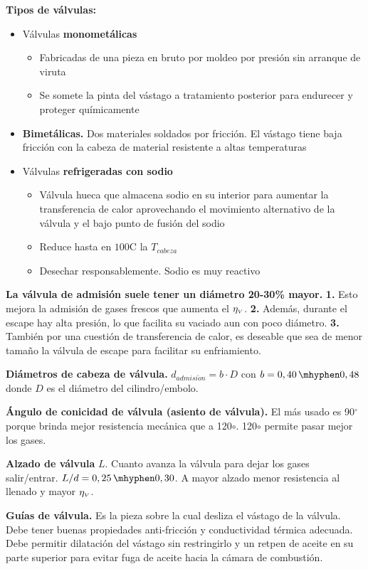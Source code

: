 \textbf{Tipos de válvulas:}
\begin{itemize}
    \item Válvulas \textbf{monometálicas}
    \begin{itemize}
        \item Fabricadas de una pieza en bruto por moldeo por presión sin arranque de viruta
        \item Se somete la pinta del vástago a tratamiento posterior para endurecer y proteger químicamente
    \end{itemize}
    \item \textbf{Bimetálicas.} Dos materiales soldados por fricción. El vástago tiene baja fricción con la cabeza de material resistente a altas temperaturas
    \item Válvulas \textbf{refrigeradas con sodio}
    \begin{itemize}
        \item Válvula hueca que almacena sodio en su interior para aumentar la transferencia de calor aprovechando el movimiento alternativo de la válvula y el bajo punto de fusión del sodio
        \item Reduce hasta en $100$\grad C la $T_{cabeza}$
        \item Desechar responsablemente. Sodio es muy reactivo
\end{itemize}
\end{itemize}
    \textbf{La válvula de admisión suele tener un diámetro 20-30\% mayor.} \textbf{1.} Esto mejora la admisión de gases frescos que aumenta el $\eta_{{\mbox{\tiny$V$}}}$. \textbf{2.} Además, durante el escape hay alta presión, lo que facilita su vaciado aun con poco diámetro. \textbf{3.} También por una cuestión de transferencia de calor, es deseable que sea de menor tamaño la válvula de escape para facilitar su enfriamiento.
    
    \textbf{Diámetros de cabeza de válvula.} $d_{admisi\acute{o}n}=b\cdot D$ con $b=0,40\hyph0,48$ donde $D$ es el diámetro del cilindro/embolo.
    
    \textbf{Ángulo de conicidad de válvula (asiento de válvula).} El más usado es 90$^\circ$ porque brinda mejor resistencia mecánica que a 120$\circ$. 120$\circ$ permite pasar mejor los gases.
    
    \textbf{Alzado de válvula} $L$. Cuanto avanza la válvula para dejar los gases salir/entrar. $L/d=0,25\hyph0,30$. A mayor alzado menor resistencia al llenado y mayor $\eta_{{\mbox{\tiny$V$}}}$.

    \textbf{Guías de válvula.} Es la pieza sobre la cual desliza el vástago de la válvula. Debe tener buenas propiedades anti-fricción y conductividad térmica adecuada. Debe permitir dilatación del vástago sin restringirlo y un retpen de aceite en su parte superior para evitar fuga de aceite hacia la cámara de combustión.
    
